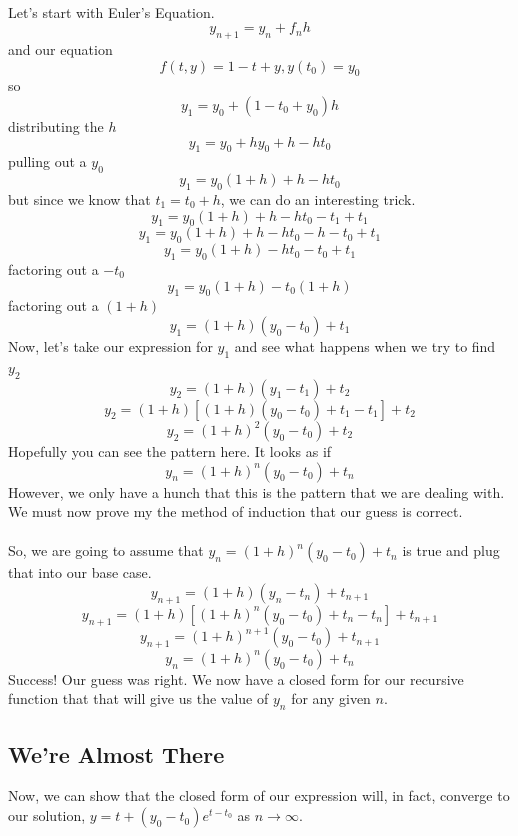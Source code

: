 \documentclass[font =22]{report}
\begin{document}
\paragraph{}
Let's start with Euler's Equation.
\[
y_{n+1} = y_n + f_nh
\]
and our equation 
\[
f(t,y) = 1 - t +y, y(t_0) = y_0
\]
so 
\[
y_{1} = y_0 + (1-t_0+y_0)h
\]
distributing the $h$
\[
y_1 = y_0 + hy_0 +h -ht_0
\]
pulling out a $y_0$
\[
y_1 = y_0(1+h) +h - ht_0
\]
but since we know that $t_1 = t_0+h$, we can do an interesting trick.
\[
y_1 = y_0(1+h) +h -ht_0 -t_1+t_1 
\]
\[
y_1 = y_0(1+h) +h -ht_0 -h-t_0 +t_1
\]
\[
y_1 = y_0(1+h) -ht_0-t_0+t_1
\]
factoring out a $-t_0$
\[
y_1 = y_0(1+h) -t_0(1+h)
\]
factoring out a $(1+h)$
\[
y_1 = (1+h) (y_0-t_0) + t_1
\]
Now, let's take our expression for $y_1$ and see what happens when we try to find $y_2$
\[
y_2 = (1+h)(y_1-t_1) + t_2
\]
\[
y_2 = (1+h)\left[(1+h)(y_0-t_0)+ t_1 - t_1\right]	 + t_2
\]
\[
y_2=(1+h)^2(y_0-t_0)+t_2
\]
Hopefully you can see the pattern here. It looks as if 
\[
y_n=(1+h)^n(y_0-t_0)+t_n
\]
However, we only have a hunch that this is the pattern that we are dealing with. We must now prove my the method of induction that our guess is correct.
\paragraph{}
So, we are going to assume that $y_n=(1+h)^n(y_0-t_0)+t_n$ is true and plug that into our base case.
\[
y_{n+1} = (1+h) (y_n-t_n) + t_{n+1}
\]
\[
y_{n+1} = (1+h) \left[(1+h)^n(y_0-t_0)+t_n -t_n\right] + t_{n+1}
\]
\[
y_{n+1} = (1+h)^{n+1}(y_0-t_0)+t_{n+1}
\]
\[ 
y_n = (1+h)^n(y_0-t_0)+t_n
\] 
Success! Our guess was right. We now have a closed form for our recursive function that that will give us the value of $y_n$ for any given $n$.

\subsection*{We're Almost There}
Now, we can show that the closed form of our expression will, in fact, converge to our solution, $y= t + (y_0 - t_0)e^{t-t_0}$ as $n \to \infty.$
\end{document}
